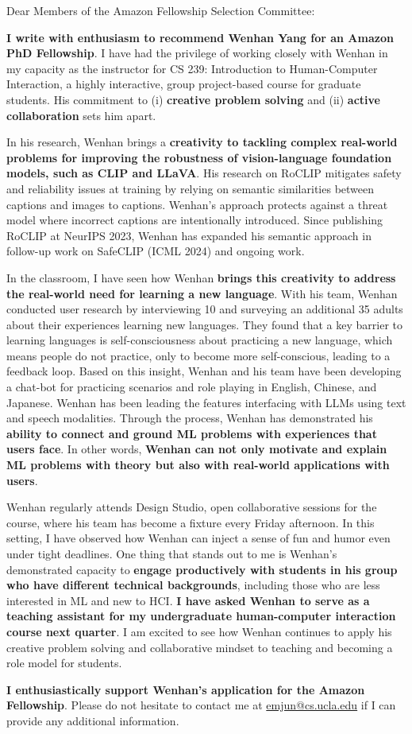 Dear Members of the Amazon Fellowship Selection Committee:

\textbf{I write with enthusiasm to recommend Wenhan Yang for an Amazon PhD
Fellowship}. I have had the privilege of working closely with Wenhan in my
capacity as the instructor for CS 239: Introduction to Human-Computer
Interaction, a highly interactive, group project-based course for graduate
students. His commitment to (i) \textbf{creative problem solving} and
(ii) \textbf{active collaboration} sets him apart.

In his research, Wenhan brings a \textbf{creativity to tackling complex real-world
problems for improving the robustness of vision-language foundation models, such
as CLIP and LLaVA}. His research on RoCLIP mitigates safety and reliability
issues at training by relying on semantic similarities between captions and
images to captions. Wenhan's approach protects against a threat model where
incorrect captions are intentionally introduced. Since publishing RoCLIP at
NeurIPS 2023, Wenhan has expanded his semantic approach in follow-up
work on SafeCLIP (ICML 2024) and ongoing work. 

In the classroom, I have seen how Wenhan \textbf{brings this creativity to
address the real-world need for learning a new language}. With his team, Wenhan
conducted user research by interviewing 10 and surveying an additional 35 adults
about their experiences learning new languages. They found that a key barrier to
learning languages is self-consciousness about practicing a new language, which
means people do not practice, only to become more self-conscious, leading to a
feedback loop. Based on this insight, Wenhan and his team have been developing a
chat-bot for practicing scenarios and role playing in English, Chinese, and
Japanese. Wenhan has been leading the features interfacing with LLMs using text
and speech modalities. Through the process, Wenhan has demonstrated his
\textbf{ability to connect and ground ML problems with experiences that users
face}. In other words, \textbf{Wenhan can not only motivate and explain ML
problems with theory but also with real-world applications with users}.

Wenhan regularly attends Design Studio, open collaborative sessions for the
course, where his team has become a fixture every Friday afternoon. In this
setting, I have observed how Wenhan can inject a sense of fun and humor even
under tight deadlines. One thing that stands out to me is Wenhan's demonstrated
capacity to \textbf{engage productively with students in his group who have different technical backgrounds},
including those who are less interested in ML and new to HCI. 
\textbf{I have asked Wenhan to serve as a teaching assistant for my
undergraduate human-computer interaction course next quarter}. I am excited to
see how Wenhan continues to apply his creative problem solving and collaborative
mindset to teaching and becoming a role model for students. 

\textbf{I
enthusiastically support Wenhan's application for the Amazon Fellowship}. 
Please do not hesitate to contact me at \href{mailto:emjun@cs.ucla.edu}{emjun@cs.ucla.edu} if I can provide any additional information.